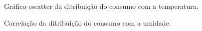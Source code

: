 \documentclass[	12pt, Times, openright, twoside, a4paper, english, brazil]{abntex2}
\begin{document}
                \begin{figure}[!ht]
                	\caption{Gráfico escatter da ditribuição do consumo com a temperatura. \label{fig:case1_temperatura_scatter} }
                \end{figure}
                 \begin{figure}[!ht]
                    	\caption{Correlação da ditribuição do consumo com a umidade. \label{fig:case1_umidade} }
                    \end{figure}
                
\end{document}
